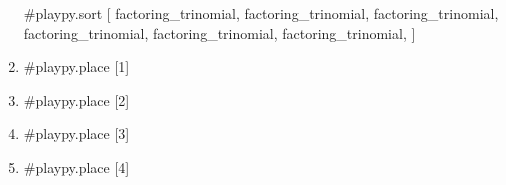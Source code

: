 \documentclass{article}
\begin{document}
    \begin{enumerate}
        #playpy.sort [
            factoring_trinomial,
            factoring_trinomial,
            factoring_trinomial,
            factoring_trinomial,
            factoring_trinomial,
            factoring_trinomial,
        ]

        \item #playpy.place [1]

        \item #playpy.place [2]

        \item #playpy.place [3]

        \item #playpy.place [4]
    \end{enumerate}
\end{document}
